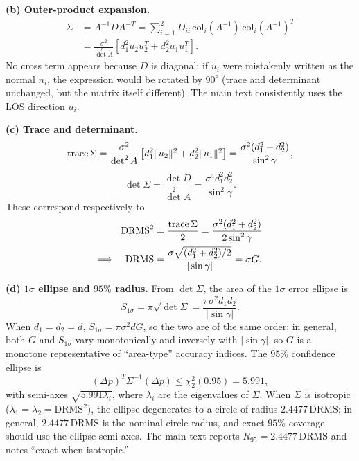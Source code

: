 \noindent\textbf{(b) Outer-product expansion.}
\begin{equation}
\begin{split}
  \Sigma&=A^{-1}DA^{-T}
  =\sum_{i=1}^{2}D_{ii}\,\mathrm{col}_i(A^{-1})\,\mathrm{col}_i(A^{-1})^T\\
  &=\frac{\sigma^2}{\det^2A}\left[d_1^2u_2u_2^T+d_2^2u_1u_1^T\right].
\end{split}
\end{equation}
No cross term appears because $D$ is diagonal; if $u_i$ were mistakenly written as the normal $n_i$, the expression would be rotated by $90^\circ$ (trace and determinant unchanged, but the matrix itself different). The main text consistently uses the LOS direction $u_i$.

\noindent\textbf{(c) Trace and determinant.}
\begin{equation}
  \operatorname{trace}\Sigma=\frac{\sigma^2}{\det^2A}\left[d_1^2\|u_2\|^2+d_2^2\|u_1\|^2\right]
  =\frac{\sigma^2(d_1^2+d_2^2)}{\sin^2\gamma},
\end{equation}
\begin{equation}
  \det\Sigma=\frac{\det D}{\det^2A}=\frac{\sigma^4d_1^2d_2^2}{\sin^2\gamma}.
\end{equation}
These correspond respectively to
\begin{equation}
\begin{split}
  \mathrm{DRMS}^2&=\frac{\operatorname{trace}\Sigma}{2}
  =\frac{\sigma^2(d_1^2+d_2^2)}{2\sin^2\gamma}\\
  \Longrightarrow\quad
  \mathrm{DRMS}&=\frac{\sigma\sqrt{(d_1^2+d_2^2)/2}}{|\sin\gamma|}=\sigma G.
\end{split}
\end{equation}

\noindent\textbf{(d) $1\sigma$ ellipse and $95\%$ radius.} From $\det\Sigma$, the area of the $1\sigma$ error ellipse is
\begin{equation}
  S_{1\sigma}=\pi\sqrt{\det\Sigma}=\frac{\pi\sigma^2d_1d_2}{|\sin\gamma|}.
\end{equation}
When $d_1=d_2=d$, $S_{1\sigma}=\pi\sigma^2dG$, so the two are of the same order; in general, both $G$ and $S_{1\sigma}$ vary monotonically and inversely with $|\sin\gamma|$, so $G$ is a monotone representative of ``area-type'' accuracy indices. The $95\%$ confidence ellipse is
\begin{equation}
  (\Delta p)^T\Sigma^{-1}(\Delta p)\le\chi^2_2(0.95)=5.991,
\end{equation}
with semi-axes $\sqrt{5.991\lambda_i}$, where $\lambda_i$ are the eigenvalues of $\Sigma$. When $\Sigma$ is isotropic ($\lambda_1=\lambda_2=\mathrm{DRMS}^2$), the ellipse degenerates to a circle of radius $2.4477\,\mathrm{DRMS}$; in general, $2.4477\,\mathrm{DRMS}$ is the nominal circle radius, and exact $95\%$ coverage should use the ellipse semi-axes. The main text reports $R_{95}=2.4477\,\mathrm{DRMS}$ and notes ``exact when isotropic.''

